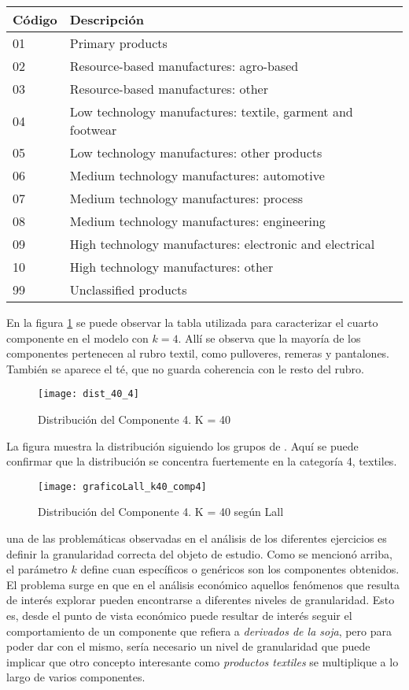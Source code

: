 \documentclass[class=article, crop=false]{standalone}
\begin{document}
\begin{table}[ht]
	\centering
	\begin{tabular}{ll}
		\hline
		 Código & Descripción \\ 
		\hline
		01 & Primary products \\ 
		02 & Resource-based manufactures: agro-based \\ 
		03 & Resource-based manufactures: other \\ 
		04 & Low technology manufactures: textile, garment and footwear \\ 
		05 & Low technology manufactures: other products \\ 
		06 & Medium technology manufactures: automotive \\ 
		07 & Medium technology manufactures: process \\ 
		08 & Medium technology manufactures: engineering \\ 
		09 & High technology manufactures: electronic and electrical \\ 
		10 & High technology manufactures: other \\ 
		99 & Unclassified products \\ 
		\hline
	\end{tabular}
\end{table}

En la figura \ref{fig:dist_40_4} se puede observar la tabla utilizada para caracterizar el cuarto componente en el modelo con $k=4$. Allí se observa que la mayoría de los componentes pertenecen al rubro textil, como pulloveres, remeras y pantalones. También se aparece el té, que no guarda coherencia con le resto del rubro.


\begin{figure}[h]
	\centering	
	\texttt{[image: dist\_40\_4]}
	\caption{Distribución del Componente 4. K = 40}
	\label{fig:dist_40_4}
\end{figure}

La figura muestra la distribución siguiendo los grupos de \cite{lall2000technological}. Aquí se puede confirmar que la distribución se concentra fuertemente en la categoría 4, textiles. 

\begin{figure}[h]
	\centering	
	\texttt{[image: graficoLall\_k40\_comp4]}
	\caption{Distribución del Componente 4. K = 40 según Lall}
	\label{fig:dist_40_4_lall}
\end{figure}

una de las problemáticas observadas en el análisis de los diferentes ejercicios es definir la granularidad correcta del objeto de estudio. Como se mencionó arriba, el parámetro $k$ define cuan específicos o genéricos son los componentes obtenidos. El problema surge en que en el análisis económico aquellos fenómenos que resulta de interés explorar pueden encontrarse a diferentes niveles de granularidad. Esto es, desde el punto de vista económico puede resultar de interés seguir el comportamiento de un componente que refiera a \textit{derivados de la soja}, pero para poder dar con el mismo, sería necesario un nivel de granularidad que puede implicar que otro concepto interesante como \textit{productos textiles} se multiplique a lo largo de varios componentes. 
\end{document}
